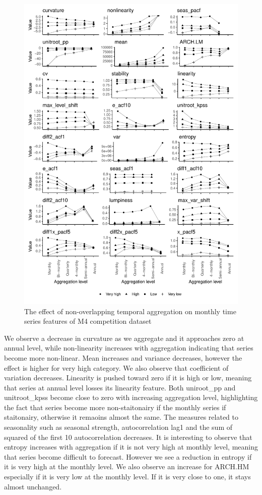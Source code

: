 \documentclass[]{elsarticle} %
\begin{document}
\begin{figure}[H]

{\centering \includegraphics[width=0.7\linewidth]{img/mp_category_all1} 

}

\caption{The effect of non-overlapping temporal aggregation on monthly time series features of M4 competition dataset}\label{fig:featureagg1}
\end{figure}

We observe a decrease in curvature as we aggregate and it approaches
zero at annual level, while non-linearity increases with aggregation
indicating that series become more non-linear. Mean increases and
variance decreases, however the effect is higher for very high category.
We also observe that coefficient of variation decreases. Linearity is
pushed toward zero if it is high or low, meaning that series at annual
level losses its linearity feature. Both uniroot\_pp and unitroot\_kpss
become close to zero with increasing aggregation level, highlighting the
fact that series become more non-staitonairy if the monthly series if
staitonairy, otherwise it remaoins almost the same. The measures related
to seasonality such as seasonal strength, autocorrelation lag1 and the
sum of squared of the first 10 autocorrelation decreases. It is
interesting to observe that entropy increases with aggregation if it is
not very high at monthly level, meaning that series become difficult to
forecast. However we see a reduction in entropy if it is very high at
the monthly level. We also observe an increase for ARCH.HM especially if
it is very low at the monthly level. If it is very close to one, it
stays almost unchanged.
\end{document}
